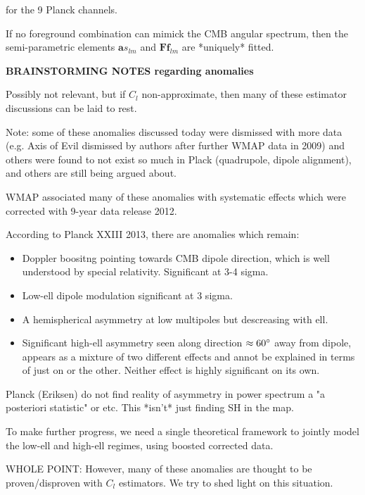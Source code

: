 \documentclass[a4paper, 11pt]{article}
\begin{document}
for the 9 Planck channels.  

If no foreground combination can mimick the CMB angular spectrum, then the semi-parametric elements $\textbf{a} s_{lm}$ and $\textbf{F} \textbf{f}_{lm}$ are *uniquely* fitted. 


\textbf{BRAINSTORMING NOTES regarding anomalies}

Possibly not relevant, but if $C_l$ non-approximate, then many of these estimator discussions can be laid to rest. 

Note: some of these anomalies discussed today were dismissed with more data (e.g. Axis of Evil dismissed by authors after further WMAP data in 2009) and others were found to not exist so much in Plack (quadrupole, dipole alignment), and others are still being argued about. 

WMAP associated many of these anomalies with systematic effects which were corrected with 9-year data release 2012. 

According to Planck XXIII 2013, there are anomalies which remain:
\begin{itemize}

\item Doppler boositng pointing towards CMB dipole direction, which is well understood by special relativity. Significant at 3-4 sigma. 

\item Low-ell dipole modulation significant at 3 sigma. 

\item A hemispherical asymmetry at low multipoles but descreasing with ell. 

\item Significant high-ell asymmetry seen along direction $\approx60\degree$ away from dipole, appears as a mixture of two different effects and annot be explained in terms of just on or the other. Neither effect is highly significant on its own. 

\end{itemize}

Planck (Eriksen) do not find reality of asymmetry in power spectrum a "a posteriori statistic" or etc. This *isn't* just finding SH in the map. 

To make further progress, we need a single theoretical framework to jointly model the low-ell and high-ell regimes, using boosted corrected data. 

WHOLE POINT: However, many of these anomalies are thought to be proven/disproven with $C_l$ estimators. We try to shed light on this situation. 
\end{document}
